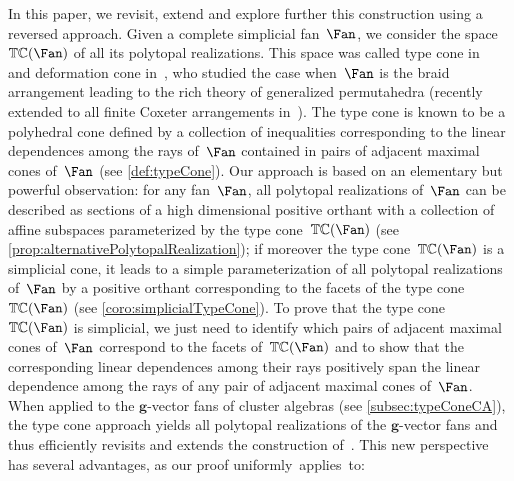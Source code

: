 \documentclass{amsart}
\theoremstyle{definition}
\renewcommand{\b}[1]{{\boldsymbol{#1}}} %
\newcommand{\typeCone}{\mathbb{TC}} %
\begin{document}
\medskip
In this paper, we revisit, extend and explore further this construction using a reversed approach.
Given a complete simplicial fan~$\Fan$, we consider the space~$\typeCone(\Fan)$ of all its polytopal realizations.
This space was called type cone in~\cite{McMullen-typeCone} and deformation cone in~\cite{Postnikov, PostnikovReinerWilliams}, who studied the case when~$\Fan$ is the braid arrangement leading to the rich theory of generalized permutahedra (recently extended to all finite Coxeter arrangements in~\cite{ArdilaCastilloEurPostnikov}).
The type cone is known to be a polyhedral cone defined by a collection of inequalities corresponding to the linear dependences among the rays of~$\Fan$ contained in pairs of adjacent maximal cones of~$\Fan$ (see \cref{def:typeCone}).
Our approach is based on an elementary but powerful observation: for any fan~$\Fan$, all polytopal realizations of~$\Fan$ can be described as sections of a high dimensional positive orthant with a collection of affine subspaces parameterized by the type cone~$\typeCone(\Fan)$ (see \cref{prop:alternativePolytopalRealization}); if moreover the type cone~$\typeCone(\Fan)$ is a simplicial cone, it leads to a simple parameterization of all polytopal realizations of~$\Fan$ by a positive orthant corresponding to the facets of the type cone~$\typeCone(\Fan)$ (see \cref{coro:simplicialTypeCone}).
To prove that the type cone~$\typeCone(\Fan)$ is simplicial, we just need to identify which pairs of adjacent maximal cones of~$\Fan$ correspond to the facets of~$\typeCone(\Fan)$ and to show that the corresponding linear dependences among their rays positively span the linear dependence among the rays of any pair of adjacent maximal cones of~$\Fan$.
When applied to the $\b{g}$-vector fans of cluster algebras (see \cref{subsec:typeConeCA}), the type cone approach yields all polytopal realizations of the $\b{g}$-vector fans and thus efficiently revisits and extends the construction of~\cite{BazierMatteChapelierLaguetDouvilleMousavandThomasYildirim}.
This new perspective has several advantages, as our proof uniformly~applies~to:
\end{document}
